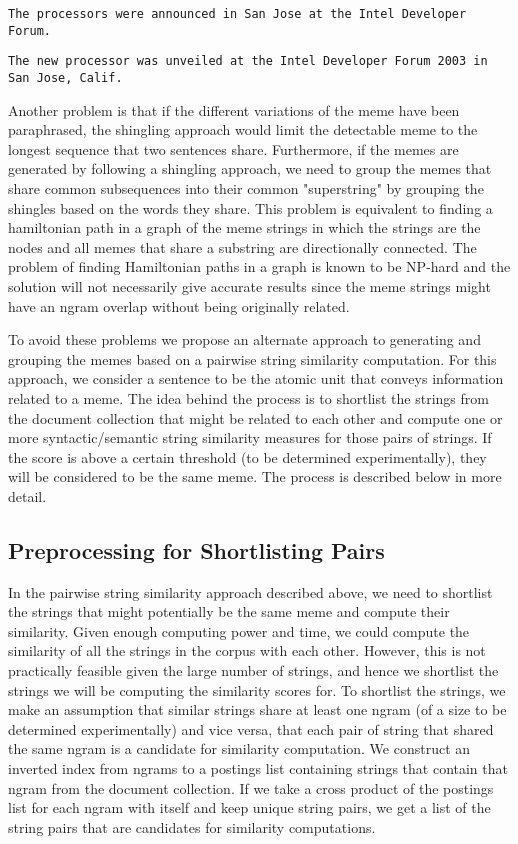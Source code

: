 \documentclass{acm_proc_article-sp}
\begin{document}
{\tt The processors were announced in San Jose at the Intel Developer Forum.}

{\tt The new processor was unveiled at the Intel Developer Forum 2003 in San Jose, Calif.}

Another problem is that if the different variations of the meme have been paraphrased, the shingling approach would limit the detectable meme to the longest sequence that two sentences share. Furthermore, if the memes are generated by following a shingling approach, we need to group the memes that share common subsequences into their common "superstring" by grouping the shingles based on the words they share. This problem is equivalent to finding a hamiltonian path in a graph of the meme strings in which the strings are the nodes and all memes that share a substring are directionally connected. The problem of finding Hamiltonian paths in a graph is known to be NP-hard and the solution will not necessarily give accurate results since the meme strings might have an ngram overlap without being originally related.

To avoid these problems we propose an alternate approach to generating and grouping the memes based on a pairwise string similarity computation. For this approach, we consider a sentence to be the atomic unit that conveys information related to a meme. The idea behind the process is to shortlist the strings from the document collection that might be related to each other and compute one or more syntactic/semantic string similarity measures for those pairs of strings. If the score is above a certain threshold (to be determined experimentally), they will be considered to be the same meme. The process is described below in more detail.

\subsection{Preprocessing for Shortlisting Pairs}
In the pairwise string similarity approach described above, we need to shortlist the strings that might potentially be the same meme and compute their similarity. Given enough computing power and time, we could compute the similarity of all the strings in the corpus with each other. However, this is not practically feasible given the large number of strings, and hence we shortlist the strings we will be computing the similarity scores for. To shortlist the strings, we make an assumption that similar strings share at least one ngram (of a size to be determined experimentally) and vice versa, that each pair of string that shared the same ngram is a candidate for similarity computation. We construct an inverted index from ngrams to a postings list containing strings that contain that ngram from the document collection. If we take a cross product of the postings list for each ngram with itself and keep unique string pairs, we get a list of the string pairs that are candidates for similarity computations.
\end{document}
